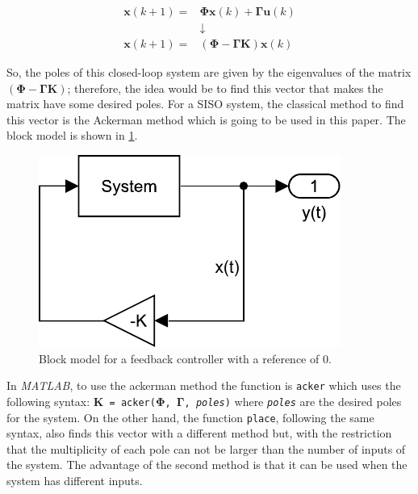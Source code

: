 \begin{align}
    \mathbf{x}(k+1) =& \mathbf{\Phi}\mathbf{x}(k) + \mathbf{\Gamma}\mathbf{u}(k)\nonumber\\
    &\downarrow\nonumber\\
    \mathbf{x}(k+1) =& \left(\mathbf{\Phi} - \mathbf{\Gamma}\mathbf{K}\right)\mathbf{x}(k)
\end{align}

So, the poles of this closed-loop system are given by the eigenvalues of the matrix $\left(\mathbf{\Phi} - \mathbf{\Gamma}\mathbf{K}\right)$; therefore, the idea would be to find this vector that makes the matrix have some desired poles. For a SISO system, the classical method to find this vector is the Ackerman method \cite{ackermann1985multi} which is going to be used in this paper. The block model is shown in \ref{fig:feedback_ref0}.

\begin{figure}[H]
    \centering
    \includegraphics[scale=0.6]{files/feedback_ref0.pdf}
    \caption{Block model for a feedback controller with a reference of 0.}
    \label{fig:feedback_ref0}
\end{figure}

In \textit{MATLAB}, to use the ackerman method the function is \texttt{acker} which uses the following syntax: \texttt{$\mathbf{K}$ = acker($\mathbf{\Phi}$, $\mathbf{\Gamma}$, \textit{poles})} where \texttt{\textit{poles}} are the desired poles for the system. On the other hand, the function \texttt{place}, following the same syntax, also finds this vector with a different method but, with the restriction that the multiplicity of each pole can not be larger than the number of inputs of the system. The advantage of the second method is that it can be used when the system has different inputs.

